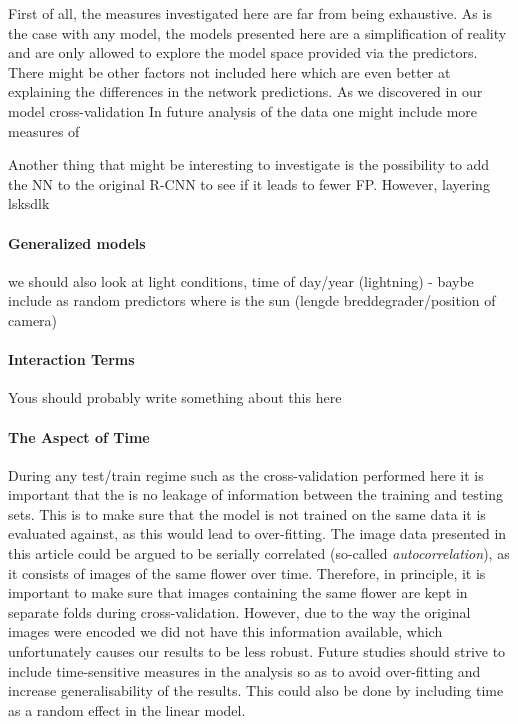 \documentclass[12pt]{article}
\begin{document}
First of all, the measures investigated here are far from being exhaustive. As is the case with any model, the models presented here are a simplification of reality and are only allowed to explore the model space provided via the predictors. There might be other factors not included here which are even better at explaining the differences in the network predictions. As we discovered in our model cross-validation In future analysis of the data one might include more measures of

Another thing that might be interesting to investigate is the possibility to add the NN to the original R-CNN to see if it leads to fewer FP. However, layering lsksdlk

\paragraph{Generalized models}
we should also look at light conditions, time of day/year (lightning) - baybe include as random predictors
where is the sun (lengde breddegrader/position of camera)

\paragraph{Interaction Terms}
Yous should probably write something about this here

\paragraph{The Aspect of Time}
During any test/train regime such as the cross-validation performed here it is important that the is no leakage of information between the training and testing sets. This is to make sure that the model is not trained on the same data it is evaluated against, as this would lead to over-fitting. The image data presented in this article could be argued to be serially correlated (so-called \textit{autocorrelation}), as it consists of images of the same flower over time. Therefore, in principle, it is important to make sure that images containing the same flower are kept in separate folds during cross-validation. However, due to the way the original images were encoded we did not have this information available, which unfortunately causes our results to be less robust. Future studies should strive to include time-sensitive measures in the analysis so as to avoid over-fitting and increase generalisability of the results. This could also be done by including time as a random effect in the linear model.
\end{document}
